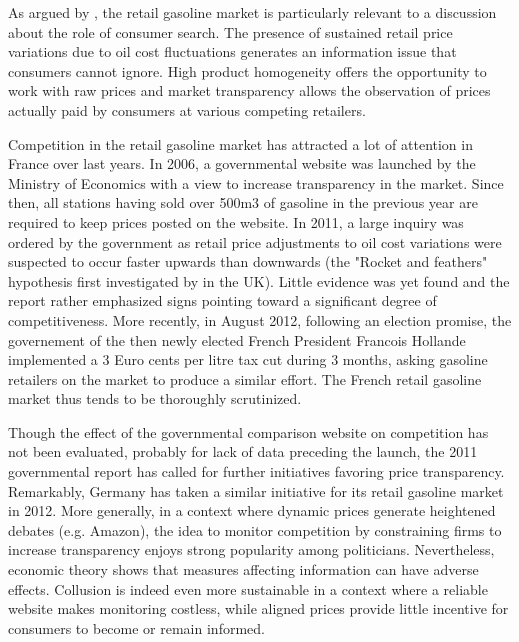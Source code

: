\documentclass[11pt]{article}
\begin{document}
As argued by \cite{TAP11}, the retail gasoline market is particularly relevant to a discussion about the role of consumer search. The presence of sustained retail price variations due to oil cost fluctuations generates an information issue that consumers cannot ignore. High product homogeneity offers the opportunity to work with raw prices and market transparency allows the observation of prices actually paid by consumers at various competing retailers.

Competition in the retail gasoline market has attracted a lot of attention in France over last years. In 2006, a governmental website was launched by the Ministry of Economics with a view to increase transparency in the market. Since then, all stations having sold over 500m3 of gasoline in the previous year are required to keep prices posted on the website. In 2011, a large inquiry was ordered by the government as retail price adjustments to oil cost variations were suspected to occur faster upwards than downwards (the "Rocket and feathers" hypothesis first investigated by \cite{BAC91} in the UK). Little evidence was yet found and the report rather emphasized signs pointing toward a significant degree of competitiveness. More recently, in August 2012, following an election promise, the governement of the then newly elected French President Francois Hollande implemented a 3 Euro cents per litre tax cut during 3 months, asking gasoline retailers on the market to produce a similar effort. The French retail gasoline market thus tends to be thoroughly scrutinized.

Though the effect of the governmental comparison website on competition has not been evaluated, probably for lack of data preceding the launch, the 2011 governmental report has called for further initiatives favoring price transparency. Remarkably, Germany has taken a similar initiative for its retail gasoline market in 2012. More generally, in a context where dynamic prices generate heightened debates (e.g. Amazon), the idea to monitor competition by constraining firms to increase transparency enjoys strong popularity among politicians. Nevertheless, economic theory shows that measures affecting information can have adverse effects. Collusion is indeed even more sustainable in a context where a reliable website makes monitoring costless, while aligned prices provide little incentive for consumers to become or remain informed.
\end{document}
